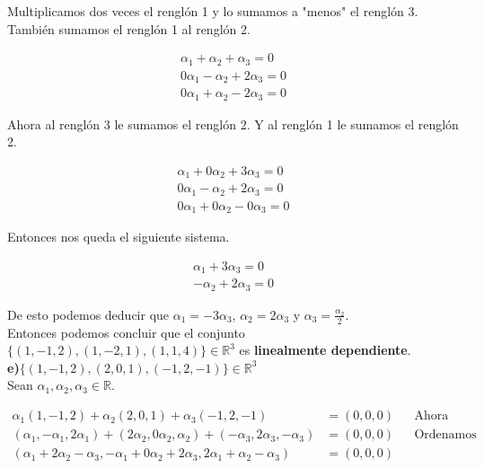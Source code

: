 \documentclass[letterpaper]{article}
\renewcommand{\*}{\cdot}
\theoremstyle{definition}
\begin{document}
Multiplicamos dos veces el renglón 1 y lo sumamos a "menos" el renglón 3. También sumamos el renglón 1 al renglón 2.
\begin{center}
	\begin{align*}
	\alpha_{1}+\alpha_{2}+\alpha_{3}=0\\
	0\alpha_{1}-\alpha_{2}+2\alpha_{3}=0\\
	0\alpha_{1}+\alpha_{2}-2\alpha_{3}=0
	\end{align*}
\end{center}

Ahora al renglón 3 le sumamos el renglón 2. Y al renglón 1 le sumamos el renglón 2.
\begin{center}
	\begin{align*}
	\alpha_{1}+0\alpha_{2}+3\alpha_{3}=0\\
	0\alpha_{1}-\alpha_{2}+2\alpha_{3}=0\\
	0\alpha_{1}+0\alpha_{2}-0\alpha_{3}=0
	\end{align*}
\end{center}

Entonces nos queda el siguiente sistema.
\begin{center}
	\begin{align*}
	\alpha_{1}+3\alpha_{3}=0\\
	-\alpha_{2}+2\alpha_{3}=0
	\end{align*}
\end{center}

De esto podemos deducir que $\alpha_{1}=-3\alpha_{3}$, $\alpha_{2}= 2\alpha_{3}$ y $\alpha_{3}= \frac{\alpha_{2}}{2}$.\\

Entonces podemos concluir que el conjunto $\lbrace (1,-1,2), (1,-2,1), (1,1,4) \rbrace \in \mathbb{R}^{3}$ es \textbf{linealmente dependiente}.\\

\textbf{e)}$\lbrace (1,-1,2), (2,0,1),(-1,2,-1)\rbrace \in \mathbb{R}^{3}$\\

Sean $\alpha_{1}, \alpha_{2}, \alpha_{3}\in \mathbb{R}$.

\begin{align*}
	\alpha_{1}(1,-1,2)+\alpha_{2}(2,0,1)+ \alpha_{3}(-1,2,-1)&=(0,0,0) && \text{Ahora}\\
	(\alpha_{1},-\alpha_{1},2\alpha_{1})+(2\alpha_{2},0\alpha_{2},\alpha_{2})+ (-\alpha_{3},2\alpha_{3},-\alpha_{3})&=(0,0,0) && \text{Ordenamos los escalares}\\
	(\alpha_{1}+2\alpha_{2}-\alpha_{3}, -\alpha_{1}+0\alpha_{2}+2\alpha_{3}, 2\alpha_{1}+\alpha_{2}-\alpha_{3}) &= (0,0,0) &&\\
\end{align*}
\end{document}
